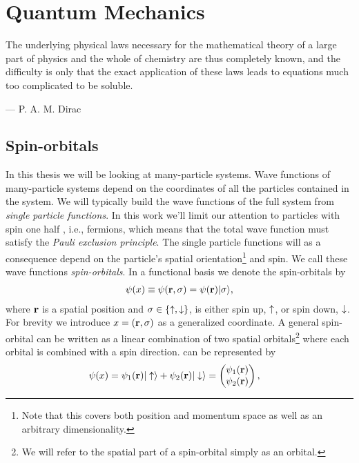 \chapter{Quantum Mechanics}
    \epigraph{The underlying physical laws necessary for the mathematical
    theory of a large part of physics and the whole of chemistry are thus
    completely known, and the difficulty is only that the exact application of
    these laws leads to equations much too complicated to be soluble.}
    {--- P. A. M. Dirac}

    \section{Spin-orbitals}
        In this thesis we will be looking at many-particle systems. Wave
        functions of many-particle systems depend on the coordinates of all the
        particles contained in the system. We will typically build the wave
        functions of the full system from \emph{single particle functions}. In
        this work we'll limit our attention to particles with spin one half ,
        i.e., fermions, which means that the total wave function must satisfy
        the \emph{Pauli exclusion principle}. The single particle functions
        will as a consequence depend on the particle's spatial
        orientation\footnote{Note that this covers both position and momentum
        space as well as an arbitrary dimensionality.} and spin. We call
        these wave functions \emph{spin-orbitals}. In a functional basis we
        denote the spin-orbitals by
        \begin{align}
            \psi(x) \equiv \psi(\mathbf{r}, \sigma) = \psi(\mathbf{r})| \sigma \rangle,
        \end{align}
        where $\mathbf{r}$ is a spatial position and $\sigma \in \left\{ \uparrow,
        \downarrow \right\}$, is either spin up, $\uparrow$, or spin down, $\downarrow$.
        For brevity we introduce $x = (\mathbf{r}, \sigma)$ as a generalized
        coordinate. A general spin-orbital can be written as a linear
        combination of two spatial orbitals\footnote{We will refer to the
        spatial part of a spin-orbital simply as an orbital.} where each orbital
        is combined with a spin direction. %
        can be represented by
        \begin{align}
            \psi(x)
            &= \psi_1(\mathbf{r})| \uparrow \rangle + \psi_2(\mathbf{r})| \downarrow \rangle
            =
            \begin{pmatrix}
                \psi_1(\mathbf{r}) \\
                \psi_2(\mathbf{r})
            \end{pmatrix},
        \end{align}
